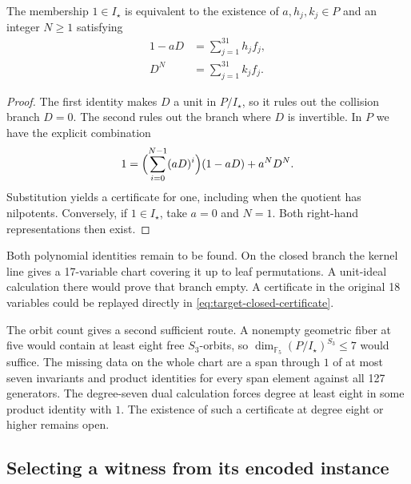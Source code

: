 \begin{proposition}
\label{prop:branch-certificates}
The membership \(1\in I_\star\) is equivalent to the existence of
\(a,h_j,k_j\in P\) and an integer \(N\ge1\) satisfying
\begin{align}
 1-aD &= \sum_{j=1}^{31}h_j f_j ,
       \label{eq:target-closed-certificate}\\
 D^N &= \sum_{j=1}^{31}k_j f_j .
       \label{eq:target-open-certificate}
\end{align}
\end{proposition}
\begin{proof}
The first identity makes \(D\) a unit in \(P/I_\star\), so it rules
out the collision branch \(D=0\). The second rules out the branch
where \(D\) is invertible. In \(P\) we have the explicit combination
\[
 1=\Bigl(\sum_{i=0}^{N-1}(aD)^i\Bigr)(1-aD)+a^N D^N .
\]
Substitution yields a certificate for one, including when the quotient
has nilpotents. Conversely, if \(1\in I_\star\), take \(a=0\) and
\(N=1\). Both right-hand representations then exist.
\end{proof}
Both polynomial identities remain to be found. On the closed branch
the kernel line gives a 17-variable chart covering it up to leaf
permutations. A unit-ideal
calculation there would prove that branch empty. A certificate in the
original 18 variables could be replayed directly in
\eqref{eq:target-closed-certificate}.



The orbit count gives a second sufficient route. A nonempty geometric
fiber at five would contain at least eight free \(S_3\)-orbits, so
\(\dim_{\mathbb F_5}(P/I_\star)^{S_3}\le7\) would suffice. The missing
data on the whole chart are a span through \(1\) of at most seven
invariants and product identities for every span element against all
127 generators. The degree-seven dual calculation forces degree at
least eight in some product identity with \(1\). The existence of
such a certificate at degree eight or higher remains open.

\subsection{Selecting a witness from its encoded instance}
\label{sec:selector-target}

